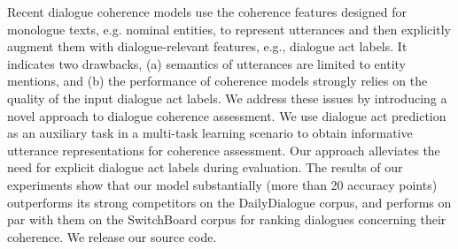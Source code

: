 Recent dialogue coherence models use the coherence features designed for monologue texts, e.g. nominal entities, to represent utterances and then explicitly augment them with dialogue-relevant features, e.g., dialogue act labels. It indicates two drawbacks, (a) semantics of utterances are limited to entity mentions, and (b) the performance of coherence models strongly relies on the quality of the input dialogue act labels. We address these issues by introducing a novel approach to dialogue coherence assessment. We use dialogue act prediction as an auxiliary task in a multi-task learning scenario to obtain informative utterance representations for coherence assessment. Our approach alleviates the need for explicit dialogue act labels during evaluation. The results of our experiments show that our model substantially (more than 20 accuracy points) outperforms its strong competitors on the DailyDialogue corpus, and performs on par with them on the SwitchBoard corpus for ranking dialogues concerning their coherence. We release our source code.
